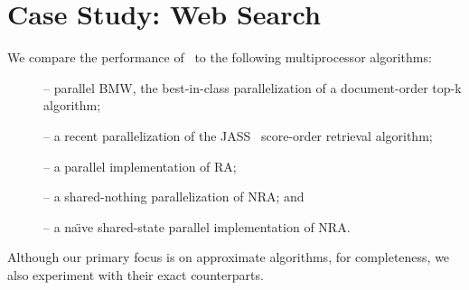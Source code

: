 \section{Case Study: Web Search} \label{sec:eval}

We compare the performance of \alg\ to the following multiprocessor algorithms: 
\begin{description}
\item[\pBMW]\cite{rojas2013efficient} -- parallel BMW,  
the best-in-class parallelization of a document-order top-k algorithm; 
\item[\pJASS]\cite{parallel-jass} -- a recent parallelization of the JASS~\cite{Lin:2015} score-order retrieval algorithm; 
\item[\pRA]-- a parallel implementation of RA;
\item[\sNRA]--  a shared-nothing  parallelization of NRA; and 
\item [\pNRA]-- a
na\"{\i}ve shared-state parallel implementation of NRA. 
\end{description}
Although our primary focus is on  approximate 
algorithms, for completeness, we also experiment with their exact counterparts.
%

